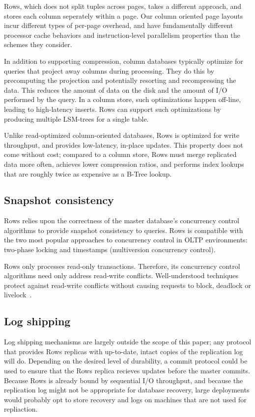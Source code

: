 \documentclass{sig-alternate-sigmod08}
\newcommand{\rows}{Rows\xspace}
\begin{document}
\rows, which does not split tuples across pages, takes a different
approach, and stores each column seperately within a page.  Our column
oriented page layouts incur different types of per-page overhead, and
have fundamentally different processor
cache behaviors and instruction-level parallelism properties than the
schemes they consider.

In addition to supporting compression, column databases typically
optimize for queries that project away columns during processing.
They do this by precomputing the projection and potentially resorting
and recompressing the data.  This reduces the amount of data on the
disk and the amount of I/O performed by the query.  In a
column store, such optimizations happen off-line, leading to
high-latency inserts.  \rows can support such optimizations by
producing multiple LSM-trees for a single table.

Unlike read-optimized column-oriented databases, \rows is optimized
for write throughput, and provides low-latency, in-place updates.
This property does not come without cost; compared to a column
store, \rows must merge replicated data more often, achieves lower
compression ratios, and performs index lookups that are roughly twice
as expensive as a B-Tree lookup.

\subsection{Snapshot consistency}

\rows relies upon the correctness of the master database's concurrency
control algorithms to provide snapshot consistency to queries.  \rows
is compatible with the two most popular approaches to concurrency
control in OLTP environments: two-phase locking and timestamps
(multiversion concurrency control).

\rows only processes read-only transactions.  Therefore, its
concurrency control algorithms need only address read-write conflicts.
Well-understood techniques protect against read-write conflicts
without causing requests to block, deadlock or
livelock~\cite{concurrencyControl}.

\subsection{Log shipping}

Log shipping mechanisms are largely outside the scope of this paper;
any protocol that provides \rows replicas with up-to-date, intact
copies of the replication log will do.  Depending on the desired level
of durability, a commit protocol could be used to ensure that the
\rows replica recieves updates before the master commits.  Because
\rows is already bound by sequential I/O throughput, and because the
replication log might not be appropriate for database recovery, large
deployments would probably opt to store recovery and logs on machines
that are not used for repliaction.
\end{document}
